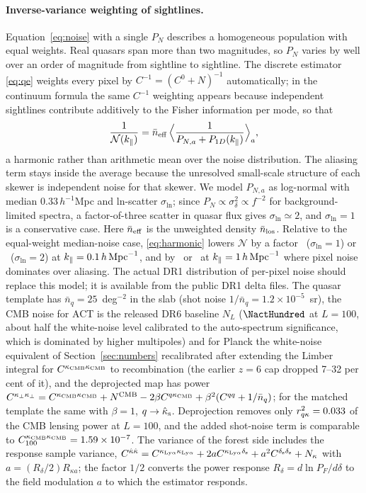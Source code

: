 \documentclass[11pt,a4paper]{article}
\newcommand{\kpar}{k_\parallel}
\newcommand{\kcmb}{\kappa_{\rm CMB}}
\newcommand{\klya}{\kappa_{{\rm Ly}\alpha}}
\begin{document}
\paragraph{Inverse-variance weighting of sightlines.}
Equation~\eqref{eq:noise} with a single $P_N$ describes a homogeneous population with equal weights. Real quasars span more than two magnitudes, so $P_N$ varies by well over an order of magnitude from sightline to sightline. The discrete estimator \eqref{eq:qe} weights every pixel by $C^{-1}=(C^0+N)^{-1}$ automatically; in the continuum formula the same $C^{-1}$ weighting appears because independent sightlines contribute additively to the Fisher information per mode, so that
\begin{equation}
\frac{1}{\mathcal N(\kpar)}=\bar n_{\rm eff}\,\Big\langle\frac{1}{P_{N,a}+P_{1D}(\kpar)}\Big\rangle_a ,
\label{eq:harmonic}
\end{equation}
a harmonic rather than arithmetic mean over the noise distribution. The aliasing term stays inside the average because the unresolved small-scale structure of each skewer is independent noise for that skewer. We model $P_{N,a}$ as log-normal with median $0.33\,h^{-1}$Mpc and ln-scatter $\sigma_{\ln}$; since $P_N\propto\sigma_\delta^2\propto f^{-2}$ for background-limited spectra, a factor-of-three scatter in quasar flux gives $\sigma_{\ln}\simeq2$, and $\sigma_{\ln}=1$ is a conservative case. Here $\bar n_{\rm eff}$ is the unweighted density $\bar n_{\rm los}$. Relative to the equal-weight median-noise case, \eqref{eq:harmonic} lowers $\mathcal N$ by a factor \nfacOneLow\ ($\sigma_{\ln}=1$) or \nfacTwoLow\ ($\sigma_{\ln}=2$) at $\kpar=0.1\,h\,{\rm Mpc}^{-1}$, and by \nfacOneHigh\ or \nfacTwoHigh\ at $\kpar=1\,h\,{\rm Mpc}^{-1}$ where pixel noise dominates over aliasing. The actual DR1 distribution of per-pixel noise should replace this model; it is available from the public DR1 delta files. The quasar template has $\bar n_q=25$~deg$^{-2}$ in the slab (shot noise $1/\bar n_q=1.2\times10^{-5}$~sr), the CMB noise for ACT is the released DR6 baseline $N_L$ ($\NactHundred$ at $L=100$, about half the white-noise level calibrated to the auto-spectrum significance, which is dominated by higher multipoles) and for Planck the white-noise equivalent of Section~\ref{sec:numbers} recalibrated after extending the Limber integral for $C^{\kcmb\kcmb}$ to recombination (the earlier $z=6$ cap dropped 7--32 per cent of it), and the deprojected map has power $C^{\kappa_\perp\kappa_\perp}=C^{\kcmb\kcmb}+N^{\rm CMB}-2\beta C^{q\kcmb}+\beta^2(C^{qq}+1/\bar n_q)$; for the matched template the same with $\beta=1$, $q\to\hat\kappa_{\rm s}$. Deprojection removes only $r^2_{q\kappa}=0.033$ of the CMB lensing power at $L=100$, and the added shot-noise term is comparable to $C^{\kcmb\kcmb}_{100}=\CkckcHundred$. The variance of the forest side includes the response sample variance, $C^{\hat\kappa\hat\kappa}=C^{\klya\klya}+2aC^{\klya\delta_{\rm s}}+a^2C^{\delta_{\rm s}\delta_{\rm s}}+N_\kappa$ with $a=(R_\delta/2)R_{\kappa a}$; the factor $1/2$ converts the power response $R_\delta=d\ln P_F/d\delta$ to the field modulation $a$ to which the estimator responds.
\end{document}
